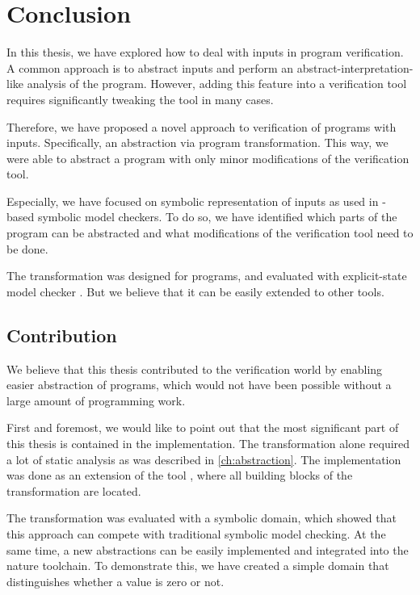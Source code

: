 \chapter{Conclusion}\label{ch:conclusion}

In this thesis, we have explored how to deal with inputs in program
verification. A common approach is to abstract inputs and perform an
abstract-interpretation-like analysis of the program. However, adding this feature into a
verification tool requires significantly tweaking the tool in many cases.

Therefore, we have proposed a novel approach to verification of programs with
inputs. Specifically, an abstraction via program transformation. This way, we
were able to abstract a program with only minor modifications of the verification
tool.

Especially, we have focused on symbolic representation of inputs as used in \SMT-based
symbolic model checkers. To do so, we have identified which parts of the program can be
abstracted and what modifications of the verification tool need to be done.

The transformation was designed for \LLVM{} programs, and evaluated with
explicit-state model checker \DIVINE. But we believe that it can be easily extended
to other tools.

\section{Contribution}
We believe that this thesis contributed to the verification world by enabling
easier abstraction of programs, which would not have been possible without a
large amount of programming work.


First and foremost, we would like to point out that the most significant part of
this thesis is contained in the implementation. The transformation alone required
a lot of static analysis as was described in \autoref{ch:abstraction}. The
implementation was done as an extension of the tool \LART, where all building
blocks of the transformation are located.

The transformation was evaluated with a symbolic domain,
which showed that this approach can compete with traditional symbolic model
checking. At the same time, a new abstractions can be easily implemented and
integrated into the nature \DIVINE toolchain. To demonstrate this, we have created a
simple domain that distinguishes whether a value is zero or not.

